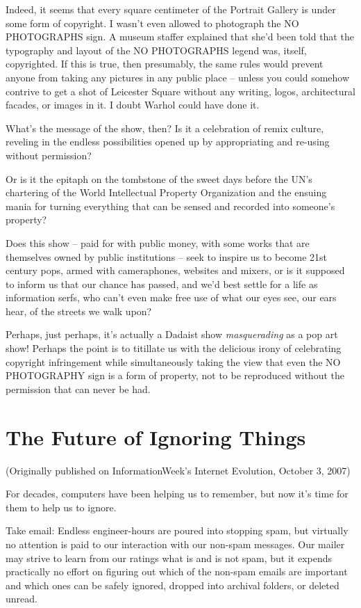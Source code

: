 Indeed, it seems that every square centimeter of the Portrait
Gallery is under some form of copyright. I wasn't even allowed to
photograph the NO PHOTOGRAPHS sign. A museum staffer explained that
she'd been told that the typography and layout of the NO
PHOTOGRAPHS legend was, itself, copyrighted. If this is true, then
presumably, the same rules would prevent anyone from taking any
pictures in any public place -- unless you could somehow contrive
to get a shot of Leicester Square without any writing, logos,
architectural facades, or images in it. I doubt Warhol could have
done it.

What's the message of the show, then? Is it a celebration of remix
culture, reveling in the endless possibilities opened up by
appropriating and re-using without permission?

Or is it the epitaph on the tombstone of the sweet days before the
UN's chartering of the World Intellectual Property Organization and
the ensuing mania for turning everything that can be sensed and
recorded into someone's property?

Does this show -- paid for with public money, with some works that
are themselves owned by public institutions -- seek to inspire us
to become 21st century pops, armed with cameraphones, websites and
mixers, or is it supposed to inform us that our chance has passed,
and we'd best settle for a life as information serfs, who can't
even make free use of what our eyes see, our ears hear, of the
streets we walk upon?

Perhaps, just perhaps, it's actually a Dadaist show
\emph{masquerading} as a pop art show! Perhaps the point is to
titillate us with the delicious irony of celebrating copyright
infringement while simultaneously taking the view that even the NO
PHOTOGRAPHY sign is a form of property, not to be reproduced
without the permission that can never be had.

\section{The Future of Ignoring Things}

(Originally published on InformationWeek's Internet Evolution,
October 3, 2007)

For decades, computers have been helping us to remember, but now
it's time for them to help us to ignore.

Take email: Endless engineer-hours are poured into stopping spam,
but virtually no attention is paid to our interaction with our
non-spam messages. Our mailer may strive to learn from our ratings
what is and is not spam, but it expends practically no effort on
figuring out which of the non-spam emails are important and which
ones can be safely ignored, dropped into archival folders, or
deleted unread.

